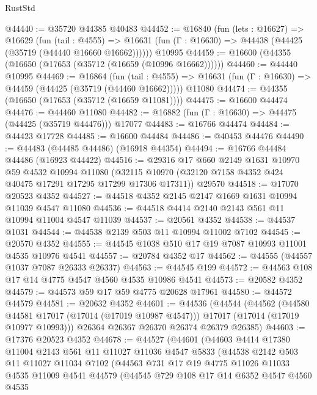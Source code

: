 \begin{lexlean}{RustStd}
\begin{coremodule}
{\begin{coremodule}
{{{{{{{{{{{{{{{{{{{{{{{{{{{{{{{{{{{{{{{{{{{{{{{{{{{{{{{@44440 := @35720 @44385 @40483
@44452 := @16840
    (fun (lets : @16627) =>
    @16629
      (fun (tail : @4555) =>
      @16631 (fun (Γ : @16630) => @44438 (@44425 (@35719 (@44440 @16660 @16662))))))
    @10995
@44459 := @16600 (@44355 (@16650 (@17653 (@35712 (@16659 (@10996 @16662))))))
@44460 := @44440 @10995
@44469 := @16864
    (fun (tail : @4555) => @16631 (fun (Γ : @16630) => @44459 (@44425 (@35719 (@44460 @16662)))))
    @11080
@44474 := @44355 (@16650 (@17653 (@35712 (@16659 @11081))))
@44475 := @16600 @44474
@44476 := @44460 @11080
@44482 := @16882 (fun (Γ : @16630) => @44475 (@44425 (@35719 @44476))) @17077
@44483 := @16766 @44474
@44484 := @44423 @17728
@44485 := @16600 @44484
@44486 := @40453 @44476
@44490 := @44483 (@44485 @44486) (@16918 @44354)
@44494 := @16766 @44484 @44486 (@16923 @44422)
@44516 := @29316
    @17
    @660
    @2149
    @1631
    @10970
    @59
    @4532
    @10994
    @11080
    (@32115 @10970 (@32120 @7158 @4352 @424 @40475 @17291 @17295 @17299 @17306 @17311))
    @29570
@44518 := @17070 @20523 @4352
@44527 := @44518 @4352 @2145 @2147 @1669 @1631 @10994 @11039 @4547 @11080
@44536 := @44518 @4414 @2140 @2143 @561 @11 @10994 @11004 @4547 @11039
@44537 := @20561 @4352
@44538 := @44537 @1031
@44544 := @44538 @2139 @503 @11 @10994 @11002 @7102
@44545 := @20570 @4352
@44555 := @44545 @1038 @510 @17 @19 @7087 @10993 @11001 @4535 @10976 @4541
@44557 := @20784 @4352 @17
@44562 := @44555 (@44557 @1037 @7087 @26333 @26337)
@44563 := @44545 @199
@44572 := @44563 @108 @17 @14 @4775 @4547 @4560 @4535 @10986 @4541
@44573 := @20582 @4352
@44579 := @44573 @59 @17 @59 @4775 @20628 @17961
@44580 := @44572 @44579
@44581 := @20632 @4352
@44601 := @44536
    (@44544
      (@44562
        (@44580 @44581 @17017 (@17014 (@17019 @10987 @4547)))
        @17017
        (@17014 (@17019 @10977 @10993)))
      @26364
      @26367
      @26370
      @26374
      @26379
      @26385)
@44603 := @17376 @20523 @4352
@44678 := @44527
    (@44601
      (@44603
        @4414
        @17380
        @11004
        @2143
        @561
        @11
        @11027
        @11036
        @4547
        @5833
        (@44538
          @2142
          @503
          @11
          @11027
          @11034
          @7102
          (@44563
            @731
            @17
            @19
            @4775
            @11026
            @11033
            @4535
            @11009
            @4541
            @44579
            (@44545
              @729
              @108
              @17
              @14
              @6352
              @4547
              @4560
              @4535
}}}}}}}}}}}}}}}}}}}}}}}}}}}}}}}}}}}}}}}}}}}}}}}}}}}}}}}
\end{coremodule}}
\end{coremodule}
\end{lexlean}

